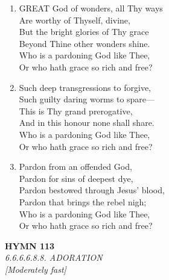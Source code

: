 \begin{enumerate}
    \item GREAT God of wonders, all Thy ways \\
        Are worthy of Thyself, divine, \\
        But the bright glories of Thy grace \\
        Beyond Thine other wonders shine. \\
        Who is a pardoning God like Thee, \\
        Or who hath grace so rich and free?

    \item Such deep transgressions to forgive, \\
        Such guilty daring worms to spare--- \\
        This is Thy grand prerogative, \\
        And in this honour none shall share. \\
        Who is a pardoning God like Thee, \\
        Or who hath grace so rich and free?

    \item Pardon from an offended God, \\
        Pardon for sins of deepest dye, \\
        Pardon bestowed through Jesus' blood, \\
        Pardon that brings the rebel nigh; \\
        Who is a pardoning God like Thee, \\
        Or who hath grace so rich and free?

\end{enumerate}

\newpage
\begin{center}
    {\Large \textbf{HYMN 113}}
    \\
    \textit{6.6.6.6.8.8. ADORATION}
    \\
    \textit{\small [Moderately fast]}
\end{center}
\vspace{1em}

